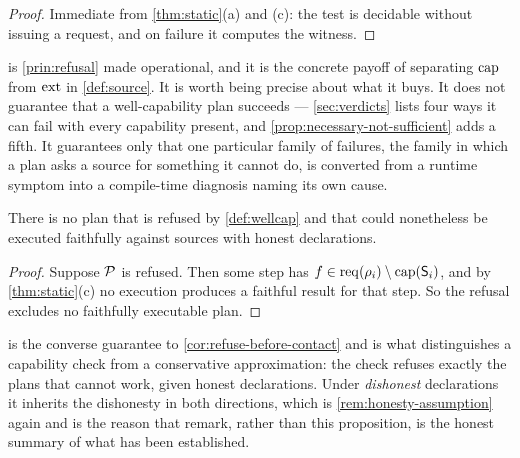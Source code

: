 \begin{proof}
Immediate from \cref{thm:static}(a) and (c): the test is decidable without
issuing a request, and on failure it computes the witness.
\end{proof}

 is \cref{prin:refusal} made operational, and
it is the concrete payoff of separating $\mathrm{cap}$ from $\mathrm{ext}$ in
\cref{def:source}. It is worth being precise about what it buys. It does not
guarantee that a well-capability plan succeeds --- \cref{sec:verdicts} lists
four ways it can fail with every capability present, and
\cref{prop:necessary-not-sufficient} adds a fifth. It guarantees only that one
particular family of failures, the family in which a plan asks a source for
something it cannot do, is converted from a runtime symptom into a
compile-time diagnosis naming its own cause.

\begin{proposition}
\label{prop:check-tight}
There is no plan that is refused by \cref{def:wellcap} and that could
nonetheless be executed faithfully against sources with honest declarations.
\end{proposition}

\begin{proof}
Suppose $\mathcal{P}$ is refused. Then some step has
$f \in \mathrm{req}(\rho_i)\setminus\mathrm{cap}(\mathsf{S}_i)$, and by \cref{thm:static}(c) no
execution produces a faithful result for that step. So the refusal excludes no
faithfully executable plan.
\end{proof}

 is the converse guarantee to
\cref{cor:refuse-before-contact} and is what distinguishes a capability check
from a conservative approximation: the check refuses exactly the plans that
cannot work, given honest declarations. Under \emph{dishonest} declarations it
inherits the dishonesty in both directions, which is
\cref{rem:honesty-assumption} again and is the reason that remark, rather than
this proposition, is the honest summary of what has been established.
